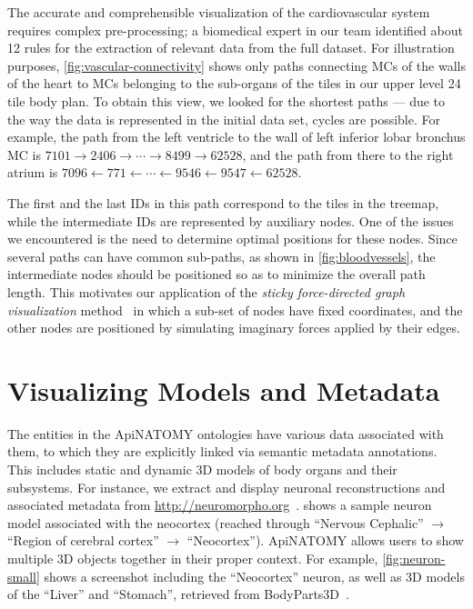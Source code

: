 The accurate and comprehensible visualization of the cardiovascular system requires complex
pre-processing; a biomedical expert in our team identified about 12 rules for the extraction of
relevant data from the full dataset.
For illustration purposes, \cref{fig:vascular-connectivity} shows only paths connecting MCs of the
walls of the heart to MCs belonging to the sub-organs of the tiles in our upper level 24 tile body
plan. To obtain this view, we looked for the shortest paths --- due to the way the data is represented
in the initial data set, cycles are possible. For example, the path from the left ventricle to the
wall of left inferior lobar bronchus MC is
{$7101 \rightarrow 2406 \rightarrow \cdots \rightarrow 8499 \rightarrow 62528$,}
and the path from there to the right atrium is
{$7096 \leftarrow 771 \leftarrow \cdots \leftarrow 9546 \leftarrow 9547 \leftarrow 62528$.}

The first and the last IDs in this path correspond to the tiles in the treemap, while the intermediate
IDs are represented by auxiliary nodes. One of the issues we
encountered is the need to determine optimal positions for these nodes. Since several paths can have
common sub-paths, as shown in \cref{fig:bloodvessels}, the intermediate nodes should be positioned
so as to minimize the overall path length. This motivates our application of the \emph{sticky
force-directed graph visualization} method~\cite{FR91,Bos14} in which a sub-set of nodes have fixed
coordinates, and the other nodes are positioned by simulating imaginary forces
applied by their edges.


\section{Visualizing Models and Metadata} \label{sect:visualization2}                    %

The entities in the ApiNATOMY ontologies have various data associated with them, to which they are explicitly linked via semantic metadata annotations. This includes static and dynamic 3D models of body organs and their subsystems.
For instance, we extract and display neuronal reconstructions and associated metadata from \url{http://neuromorpho.org}~\cite{Asc06}.
 shows a sample neuron model associated with the neocortex (reached through ``Nervous Cephalic'' $\rightarrow$ ``Region of cerebral cortex'' $\rightarrow$ ``Neocortex''). ApiNATOMY allows users to show multiple 3D objects together in their proper context. For example, \cref{fig:neuron-small} shows a screenshot including the ``Neocortex'' neuron, as well as 3D models of the ``Liver'' and ``Stomach'', retrieved from BodyParts3D~\cite{MFT+09}.

